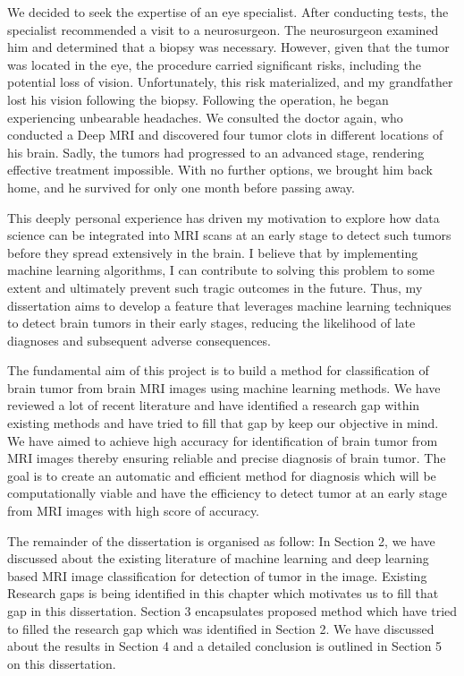 \documentclass[12pt, a4paper,twoside]{report}
\theoremstyle{plain} %
\theoremstyle{definition} %
\theoremstyle{remark} %
\numberwithin{equation}{chapter}
\begin{document}
We decided to seek the expertise of an eye specialist. After conducting tests, the specialist recommended a visit to a neurosurgeon. The neurosurgeon examined him and determined that a biopsy was necessary. However, given that the tumor was located in the eye, the procedure carried significant risks, including the potential loss of vision. Unfortunately, this risk materialized, and my grandfather lost his vision following the biopsy. Following the operation, he began experiencing unbearable headaches. We consulted the doctor again, who conducted a Deep MRI and discovered four tumor clots in different locations of his brain. Sadly, the tumors had progressed to an advanced stage, rendering effective treatment impossible. With no further options, we brought him back home, and he survived for only one month before passing away.

This deeply personal experience has driven my motivation to explore how data science can be integrated into MRI scans at an early stage to detect such tumors before they spread extensively in the brain. I believe that by implementing machine learning algorithms, I can contribute to solving this problem to some extent and ultimately prevent such tragic outcomes in the future. Thus, my dissertation aims to develop a feature that leverages machine learning techniques to detect brain tumors in their early stages, reducing the likelihood of late diagnoses and subsequent adverse consequences.

The fundamental aim of this project is to build a method for classification of brain tumor from brain MRI images using machine learning methods. We have reviewed a lot of recent literature and have identified a research gap within existing methods and have tried to fill that gap by keep our objective in mind. We have aimed to achieve high accuracy for identification of brain tumor from MRI images thereby ensuring reliable and precise diagnosis of brain tumor. The goal is to create an automatic and efficient method for diagnosis which will be computationally viable and have the efficiency to detect tumor at an early stage from MRI images with high score of accuracy.

The remainder of the dissertation is organised as follow: In Section 2, we have discussed about the existing literature of machine learning and deep learning based MRI image classification for detection of tumor in the image. Existing Research gaps is being identified in this chapter which motivates us to fill that gap in this dissertation. Section 3 encapsulates proposed method which have tried to filled the research gap which was identified in Section 2. We have discussed about the results in Section 4 and a detailed conclusion is outlined in Section 5 on this dissertation. 
\end{document}
